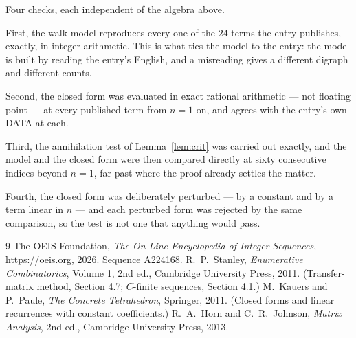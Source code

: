 \documentclass[11pt,a4paper]{article}
\theoremstyle{plain}
\theoremstyle{definition}
\begin{document}
Four checks, each independent of the algebra above.

First, the walk model reproduces every one of the $24$ terms the entry publishes,
exactly, in integer arithmetic. This is what ties the model to the entry: the model is built
by reading the entry's English, and a misreading gives a different digraph and different
counts.

Second, the closed form was evaluated in exact rational arithmetic --- not floating point ---
at every published term from $n=1$ on, and agrees with the entry's own DATA at each.

Third, the annihilation test of Lemma~\ref{lem:crit} was carried out exactly, and the model
and the closed form were then compared directly at sixty consecutive indices beyond
$n=1$, far past where the proof already settles the matter.

Fourth, the closed form was deliberately perturbed --- by a constant and by a term linear in
$n$ --- and each perturbed form was rejected by the same comparison, so the test is not one
that anything would pass.

\begin{thebibliography}{9}
 The OEIS Foundation, \emph{The On-Line Encyclopedia of Integer
Sequences}, \url{https://oeis.org}, 2026. Sequence A224168.
 R.~P.~Stanley, \emph{Enumerative Combinatorics}, Volume 1, 2nd ed.,
Cambridge University Press, 2011. (Transfer-matrix method, Section 4.7; $C$-finite sequences,
Section 4.1.)
 M.~Kauers and P.~Paule, \emph{The Concrete Tetrahedron}, Springer, 2011.
(Closed forms and linear recurrences with constant coefficients.)
 R.~A.~Horn and C.~R.~Johnson, \emph{Matrix Analysis}, 2nd ed., Cambridge
University Press, 2013.
\end{thebibliography}
\end{document}
